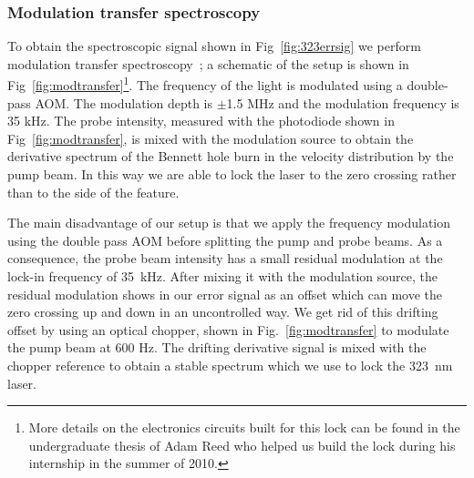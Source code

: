 \documentclass[oneside,12pt]{memoir}
\begin{document}
\subsubsection{Modulation transfer spectroscopy}

To obtain the spectroscopic signal shown in Fig~\ref{fig:323errsig} we perform
modulation transfer spectroscopy~\cite{ModTransfer2005}; a schematic of the
setup is shown in Fig~\ref{fig:modtransfer}\footnote{More details on the
electronics circuits built for this lock can be found in the undergraduate
thesis of Adam Reed who helped us build the lock during his internship in the
summer of 2010.}.    The frequency of the light is modulated using a
double-pass AOM.  The modulation depth is $\pm$1.5 MHz and the modulation
frequency is 35 kHz. The probe intensity,  measured with the photodiode shown
in Fig~\ref{fig:modtransfer}, is mixed with the modulation source to obtain the
derivative spectrum of the Bennett hole burn in the velocity distribution by
the pump beam.  In this way we are able to lock the laser to the zero crossing
rather than to the side of the feature.  

The main disadvantage of our setup is that we apply the frequency modulation
using the double pass AOM before splitting the pump and probe beams.  As a
consequence, the probe beam intensity has a small residual modulation at the
lock-in frequency of 35~kHz.  After mixing it with the modulation source, the
residual modulation shows in our error signal as an offset which can move the
zero crossing up and down in an uncontrolled way.   We get rid of this drifting
offset by using an optical chopper, shown in Fig.~\ref{fig:modtransfer} to
modulate the pump beam at 600 Hz.   The drifting derivative signal is mixed
with the chopper reference to obtain a stable spectrum which we use to lock the
323~nm laser.  
 
\end{document}
